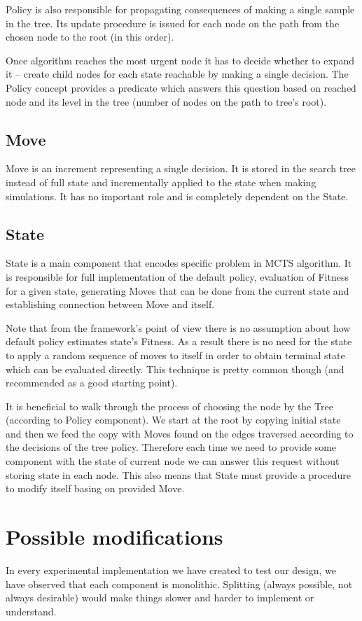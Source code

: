 Policy is also responsible for propagating consequences of making a single
sample in the tree. Its update procedure is issued for each node on the path
from the chosen node to the root (in this order).

Once algorithm reaches the most urgent node it has to decide whether to expand
it -- create child nodes for each state reachable by making a single decision.
The Policy concept provides a predicate which answers this question based on
reached node and its level in the tree (number of nodes on the path to tree's
root).

\subsection{Move}
Move is an increment representing a single decision. It is stored in the search
tree instead of full state and incrementally applied to the state when making
simulations. It has no important role and is completely dependent on the State.

\subsection{State}
State is a main component that encodes specific problem in MCTS algorithm.  It
is responsible for full implementation of the default policy, evaluation of Fitness
for a given state, generating Moves that can be done from the current state and
establishing connection between Move and itself.

Note that from the framework's point of view there is no assumption about how
default policy estimates state's Fitness. As a result there is no need for the state to
apply a random sequence of moves to itself in order to obtain terminal state
which can be evaluated directly. This technique is pretty common though (and
recommended as a good starting point).

It is beneficial to walk through the process of choosing the node by the Tree
(according to Policy component). We start at the root by copying initial state
and then we feed the copy with Moves found on the edges traversed according to
the decisions of the tree policy. Therefore each time we need to provide some
component with the state of current node we can answer this request without
storing state in each node. This also means that State must provide a procedure
to modify itself basing on provided Move.

\section{Possible modifications}
In every experimental implementation we have created to test our design, we
have observed that each component is monolithic. Splitting (always possible,
not always desirable) would make things slower and harder to implement or
understand.

